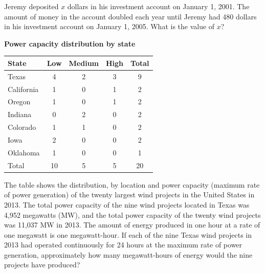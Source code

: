 
\vspace{2em}


\noindent\markforreview
\vspace{1em}

Jeremy deposited $x$ dollars in his investment account on January 1, 2001.  
The amount of money in the account doubled each year until Jeremy had 480 dollars in his investment account on January 1, 2005.  
What is the value of $x$?

\newpage

\noindent\markforreview
\vspace{1em}

\textbf{Power capacity distribution by state}
\begin{center}
    

\begin{tabular}{|l|c|c|c|c|}
\hline
State & Low & Medium & High & Total \\
\hline
Texas & 4 & 2 & 3 & 9 \\
California & 1 & 0 & 1 & 2 \\
Oregon & 1 & 0 & 1 & 2 \\
Indiana & 0 & 2 & 0 & 2 \\
Colorado & 1 & 1 & 0 & 2 \\
Iowa & 2 & 0 & 0 & 2 \\
Oklahoma & 1 & 0 & 0 & 1 \\
\hline
Total & 10 & 5 & 5 & 20 \\
\hline
\end{tabular}
\end{center}

\vspace{1em}

The table shows the distribution, by location and power capacity (maximum rate of power generation) of the twenty largest wind projects in the United States in 2013.  
The total power capacity of the nine wind projects located in Texas was 4,952 megawatts (MW), and the total power capacity of the twenty wind projects was 11,037 MW in 2013.  
The amount of energy produced in one hour at a rate of one megawatt is one megawatt-hour.  
If each of the nine Texas wind projects in 2013 had operated continuously for 24 hours at the maximum rate of power generation, approximately how many megawatt-hours of energy would the nine projects have produced?

\vspace{0.75em}

